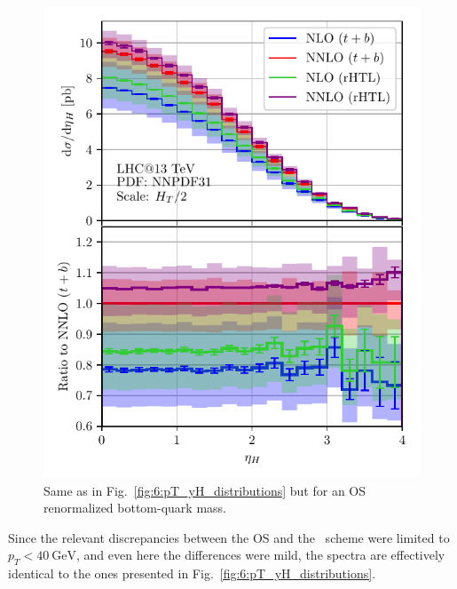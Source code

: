 \begin{figure}[h]
\begin{minipage}[t]{0.49\textwidth}
  \includegraphics[width=\textwidth]{Images/yH_13000_bOS_tOS.pdf}
\end{minipage}
\caption{Same as in Fig.~\ref{fig:6:pT_yH_distributions} but for an \acs{OS} renormalized bottom-quark mass.}
\label{fig:app4:pT_yH_distributions}
\end{figure}
Since the relevant discrepancies between the \acs{OS} and the \MS\ scheme were limited to $p_T< 40\ \mathrm{GeV}$, and even here the differences were mild, the spectra are effectively identical to the ones presented in Fig.~\ref{fig:6:pT_yH_distributions}.